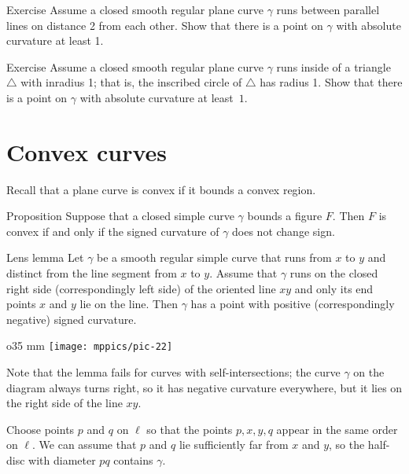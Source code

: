 \begin{thm}{Exercise}\label{ex:between-parallels-1}
Assume a closed smooth regular plane curve $\gamma$ runs between parallel lines on distance 2 from each other.
Show that there is a point on $\gamma$ with absolute curvature at least 1.
\end{thm}

\begin{thm}{Exercise}\label{ex:in-triangle}
Assume a closed smooth regular plane curve $\gamma$ runs inside of a triangle $\triangle$ with inradius 1; that is, the inscribed circle of $\triangle$ has radius 1.
Show that there is a point on $\gamma$ with absolute curvature at least~$1$.
\end{thm}



\section*{Convex curves}

Recall that a plane curve is convex if it bounds a convex region.

\begin{thm}{Proposition}\label{prop:convex}
Suppose that a closed simple curve $\gamma$ bounds a figure $F$.
Then $F$ is convex if and only if the signed curvature of $\gamma$ does not change sign.
\end{thm}


\begin{thm}{Lens lemma}\label{lem:lens}
Let $\gamma$ be a smooth regular simple curve that runs from $x$ to $y$ and distinct from the line segment from $x$ to $y$.
Assume that $\gamma$ runs on the closed right side (correspondingly left side) of the oriented line $xy$ and only its end points $x$ and $y$ lie on the line.
Then $\gamma$ has a point with positive  (correspondingly negative) signed curvature.
\end{thm}

\begin{wrapfigure}{o}{35 mm}
\vskip-4mm
\centering
\texttt{[image: mppics/pic-22]}
\vskip0mm
\end{wrapfigure}

Note that the lemma fails for curves with self-intersections;
the curve $\gamma$ on the diagram always turns right, 
so it has negative curvature everywhere, but it lies on the right side of the line $xy$.

Choose points $p$ and $q$ on $\ell$
so that the points $p, x, y, q$ appear in the same order on $\ell$.
We can assume that $p$ and $q$ lie sufficiently far from $x$ and $y$, so the half-disc with diameter $pq$ contains $\gamma$.

